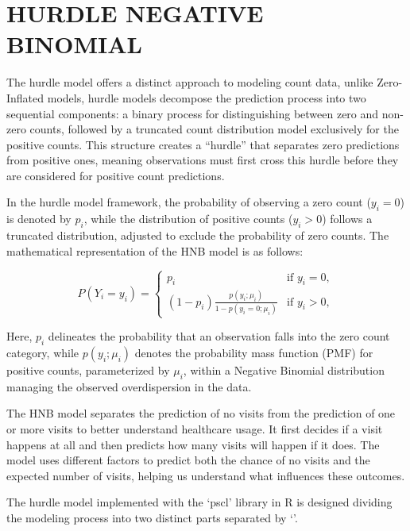 \documentclass[
]{article}
\begin{document}
\section{HURDLE NEGATIVE BINOMIAL}\label{hurdle-negative-binomial}

The hurdle model offers a distinct approach to modeling count data,
unlike Zero-Inflated models, hurdle models decompose the prediction
process into two sequential components: a binary process for
distinguishing between zero and non-zero counts, followed by a truncated
count distribution model exclusively for the positive counts. This
structure creates a ``hurdle'' that separates zero predictions from
positive ones, meaning observations must first cross this hurdle before
they are considered for positive count predictions.

In the hurdle model framework, the probability of observing a zero count
(\(y_i = 0\)) is denoted by \(p_i\), while the distribution of positive
counts (\(y_i > 0\)) follows a truncated distribution, adjusted to
exclude the probability of zero counts. The mathematical representation
of the HNB model is as follows:

\[
P(Y_i = y_i) = 
\begin{cases} 
p_i & \text{if } y_i = 0, \\
(1 - p_i) \frac{p(y_i; \mu_i)}{1 - p(y_i = 0; \mu_i)} & \text{if } y_i > 0,
\end{cases}
\]

Here, \(p_i\) delineates the probability that an observation falls into
the zero count category, while \(p(y_i; \mu_i)\) denotes the probability
mass function (PMF) for positive counts, parameterized by \(\mu_i\),
within a Negative Binomial distribution managing the observed
overdispersion in the data.

The HNB model separates the prediction of no visits from the prediction
of one or more visits to better understand healthcare usage. It first
decides if a visit happens at all and then predicts how many visits will
happen if it does. The model uses different factors to predict both the
chance of no visits and the expected number of visits, helping us
understand what influences these outcomes.

The hurdle model implemented with the `pscl' library in R is designed
dividing the modeling process into two distinct parts separated by
`\textbar{}'.
\end{document}
